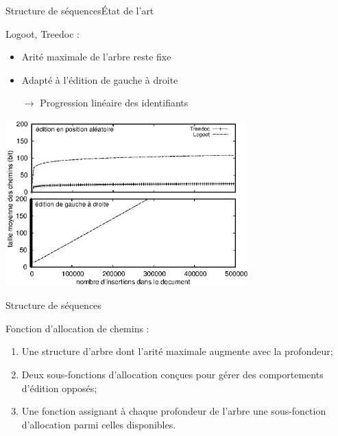 \begin{frame}{Structure de séquences}{État de l'art}
  
  Logoot,
  Treedoc : 
  \begin{itemize}
  \item Arité maximale de l'arbre reste fixe
  \item Adapté à l'édition de gauche à droite
  \item [$\rightarrow$] Progression linéaire des identifiants
  \end{itemize}

  \begin{center}
    \includegraphics[width=0.7\textwidth]{img/replication/motivationartificial.eps}
  \end{center}
  \vspace{0.025cm}

\end{frame}


\begin{frame}{Structure de séquences}{\LSEQ}
  
  Fonction d'allocation de chemins :
  \begin{enumerate}
  \item Une structure d'arbre dont l'arité maximale augmente avec la profondeur;
  \item Deux sous-fonctions d'allocation conçues pour gérer des comportements
    d'édition opposés;
  \item Une fonction assignant à chaque profondeur de l'arbre une sous-fonction
    d'allocation parmi celles disponibles.
  \end{enumerate}
  
\end{frame}



